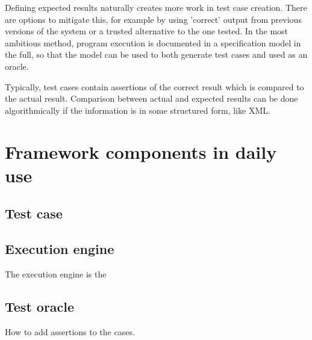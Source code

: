 \documentclass[12pt,a4paper,oneside,pdftex]{report}
\begin{document}
Defining expected results naturally creates more work in test case creation. There are options to mitigate this, for example by using 'correct' output from previous versions of the system or a trusted alternative to the one tested. In the most ambitious method, program execution is documented in a specification model in the full, so that the model can be used to both generate test cases and used as an oracle. \citep{pezze2008software}

Typically, test cases contain assertions of the correct result which is compared to the actual result. Comparison between actual and expected results can be done algorithmically if the information is in some structured form, like XML.

\section{Framework components in daily use}


\subsection{Test case}



\subsection{Execution engine}

The execution engine is the 

\subsection{Test oracle}

How to add assertions to the cases.
\end{document}
